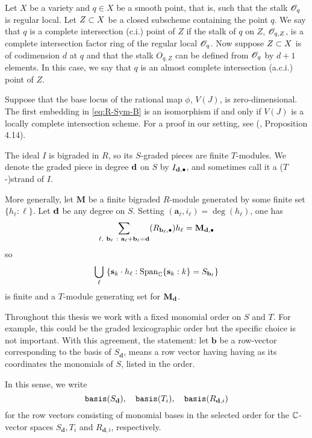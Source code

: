 \documentclass[fleqn,reqno]{amsart}
\begin{document}
\begin{paragraf}
\label{par:ci-points}
Let $X$ be a variety and $q\in X$ be a smooth point, that is,
such that the stalk $\mathscr{O}_q$ is regular local.
Let $Z\subset X$ be a closed subscheme containing the point $q$.
We say that $q$ is a complete intersection (c.i.) point of $Z$
if the stalk of $q$ on $Z$, $\mathscr{O}_{q,Z}$,
is a complete intersection factor ring of the regular local $\mathscr{O}_q$.
Now suppose $Z\subset X$ is of codimension $d$ at $q$
and that the stalk $O_{q,Z}$ can be defined from $\mathscr{O}_q$ by $d+1$ elements.
In this case, we say that $q$ is an almost complete intersection (a.c.i.)
point of $Z$.
\end{paragraf}

\begin{paragraf}
\label{par:linear-type}
Suppose that the base locus of the rational map $\phi$, $V(J)$, is zero-dimensional.
The first embedding in \eqref{eq:R-Sym-B} is an isomorphism if and only if
$V(J)$ is a locally complete intersection scheme.
For a proof in our setting, see (\citet{BJ-03}, Proposition 4.14).
\end{paragraf}

\begin{paragraf}
\label{lemma:push-gens}
The ideal $I$ is bigraded in $R$, so its $S$-graded pieces are finite $T$-modules.
We denote the graded piece in degree $\mathbf d$ on $S$ by $I_{\mathbf d,\bullet}$,
and sometimes call it a ($T$-)strand of $I$.

More generally, let $\mathbf M$ be a finite bigraded $R$-module
generated by some finite set $\{h_\ell:\ell\}$.
Let $\mathbf d$ be any degree on $S$.
Setting $({\mathbf a}_\ell,i_\ell)=\deg(h_\ell)$, one has
\[
	\displaystyle\sum_{\ell,~{\mathbf b}_\ell~:~{\mathbf a}_\ell+{\mathbf b}_\ell=\mathbf d}
	(R_{{\mathbf b}_\ell,\bullet}) h_\ell={\mathbf M}_{\mathbf d,\bullet}
\]
so
\[
	\displaystyle\bigcup_{\ell}~\{\mathbf s_k\cdot h_\ell:\operatorname{Span}_{\mathbb{C}}\{\mathbf s_k:k\}=
	S_{{\mathbf b}_\ell}\}
\]
is finite and a $T$-module generating set for $\mathbf M_\mathbf d$.
\end{paragraf}

\begin{paragraf}
\label{par:basis}
Throughout this thesis we work with a fixed monomial order on $S$ and $T$.
For example, this could be the graded lexicographic order but the specific choice
is not important.
With this agreement,
the statement:
let $\mathbf b$ be a row-vector corresponding to the basis of $S_{\mathbf d}$,
means a row vector having having as its coordinates the monomials of $S$,
listed in the order.

In this sense, we write
\[
\mathop{\tt basis}(S_{\mathbf d}),\quad\mathop{\tt basis}(T_i),\quad\mathop{\tt basis}(R_{\mathbf d,i})
\]
for the row vectors consisting of monomial bases in the selected order for the $\mathbb{C}$-vector spaces
$S_{\mathbf d}, T_i$  and $R_{\mathbf d,i}$, respectively.
\end{paragraf}
\end{document}
